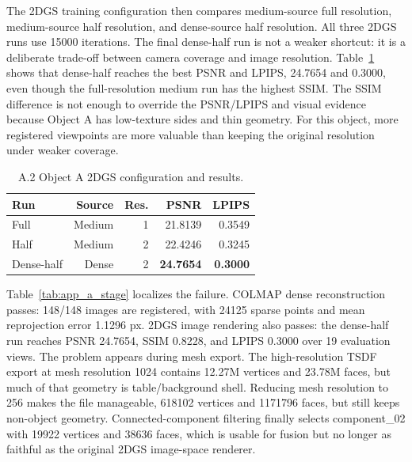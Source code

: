 \documentclass[10pt,twocolumn,letterpaper]{article}
\begin{document}
The 2DGS training configuration then compares medium-source full resolution, medium-source half resolution, and dense-source half resolution.
All three 2DGS runs use 15000 iterations.
The final dense-half run is not a weaker shortcut: it is a deliberate trade-off between camera coverage and image resolution.
Table~\ref{tab:app_a_2dgs} shows that dense-half reaches the best PSNR and LPIPS, 24.7654 and 0.3000, even though the full-resolution medium run has the highest SSIM.
The SSIM difference is not enough to override the PSNR/LPIPS and visual evidence because Object A has low-texture sides and thin geometry.
For this object, more registered viewpoints are more valuable than keeping the original resolution under weaker coverage.

\begin{table}[t]
\centering
\caption{A.2 Object A 2DGS configuration and results.}
\label{tab:app_a_2dgs}
\begin{tabular}{lrrrr}
\toprule
Run & Source & Res. & PSNR & LPIPS \\
\midrule
Full & Medium & 1 & 21.8139 & 0.3549 \\
Half & Medium & 2 & 22.4246 & 0.3245 \\
Dense-half & Dense & 2 & \textbf{24.7654} & \textbf{0.3000} \\
\bottomrule
\end{tabular}
\end{table}

Table~\ref{tab:app_a_stage} localizes the failure.
COLMAP dense reconstruction passes: 148/148 images are registered, with 24125 sparse points and mean reprojection error 1.1296 px.
2DGS image rendering also passes: the dense-half run reaches PSNR 24.7654, SSIM 0.8228, and LPIPS 0.3000 over 19 evaluation views.
The problem appears during mesh export.
The high-resolution TSDF export at mesh resolution 1024 contains 12.27M vertices and 23.78M faces, but much of that geometry is table/background shell.
Reducing mesh resolution to 256 makes the file manageable, 618102 vertices and 1171796 faces, but still keeps non-object geometry.
Connected-component filtering finally selects component\_02 with 19922 vertices and 38636 faces, which is usable for fusion but no longer as faithful as the original 2DGS image-space renderer.
\end{document}
